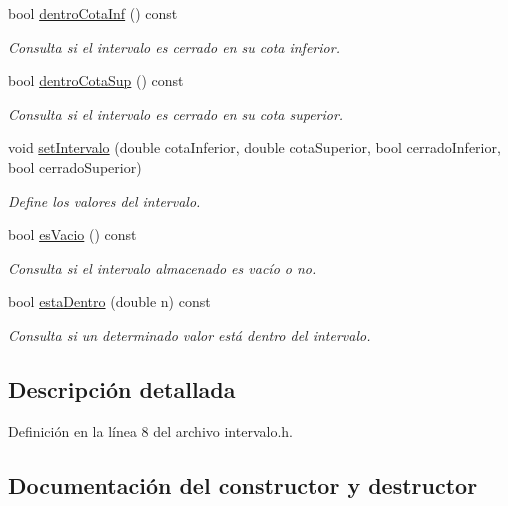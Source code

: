 \begin{DoxyCompactItemize}
bool \mbox{\hyperlink{classIntervalo_aac8f7b98dd0d702086ea897f5c9ad932}{dentro\+Cota\+Inf}} () const
\begin{DoxyCompactList}\small\item\em Consulta si el intervalo es cerrado en su cota inferior. \end{DoxyCompactList}\item 
bool \mbox{\hyperlink{classIntervalo_aed0964a68d4b727bd104f5128ee7a7ef}{dentro\+Cota\+Sup}} () const
\begin{DoxyCompactList}\small\item\em Consulta si el intervalo es cerrado en su cota superior. \end{DoxyCompactList}\item 
void \mbox{\hyperlink{classIntervalo_a3e7cfa7c148a4e60be7040fecf506313}{set\+Intervalo}} (double cota\+Inferior, double cota\+Superior, bool cerrado\+Inferior, bool cerrado\+Superior)
\begin{DoxyCompactList}\small\item\em Define los valores del intervalo. \end{DoxyCompactList}\item 
bool \mbox{\hyperlink{classIntervalo_adc77e18147f9f9f85476a0d44257bb02}{es\+Vacio}} () const
\begin{DoxyCompactList}\small\item\em Consulta si el intervalo almacenado es vacío o no. \end{DoxyCompactList}\item 
bool \mbox{\hyperlink{classIntervalo_a2cccd9264f1b3912c6006fe3e2a70289}{esta\+Dentro}} (double n) const
\begin{DoxyCompactList}\small\item\em Consulta si un determinado valor está dentro del intervalo. \end{DoxyCompactList}\end{DoxyCompactItemize}


\subsection{Descripción detallada}


Definición en la línea 8 del archivo intervalo.\+h.



\subsection{Documentación del constructor y destructor}
\mbox{\label{classIntervalo_a321e56ef7e1f4a774bd64cc2609156f4}} 
